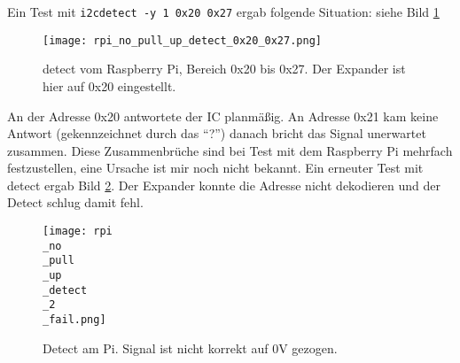 \documentclass[a4paper,10pt]{scrartcl}
\begin{document}
Ein Test mit \lstinline|i2cdetect -y 1 0x20 0x27| ergab folgende Situation: siehe Bild \ref{abb:PiDetectGood}
\begin{figure}[htb]
 \texttt{[image: rpi\_no\_pull\_up\_detect\_0x20\_0x27.png]}
 \caption{detect vom Raspberry Pi, Bereich 0x20 bis 0x27. Der Expander ist hier auf 0x20 eingestellt.}
 \label{abb:PiDetectGood}
\end{figure}
 An der Adresse 0x20 antwortete der IC planmäßig. An Adresse 0x21 kam keine Antwort (gekennzeichnet durch das "`?"') danach bricht das Signal unerwartet zusammen. Diese Zusammenbrüche sind bei Test mit dem Raspberry Pi mehrfach festzustellen, eine Ursache ist mir noch nicht bekannt. Ein erneuter Test mit detect ergab Bild \ref{abb:PiDetect2Fail}. Der Expander konnte die Adresse nicht dekodieren und der Detect schlug damit fehl.

 \begin{figure}[htb]
 \texttt{[image: rpi\\\_no\\\_pull\\\_up\\\_detect\\\_2\\\_fail.png]}
 \caption{Detect am Pi. Signal ist nicht korrekt auf 0V gezogen.}
 \label{abb:PiDetect2Fail}
\end{figure}
\end{document}
